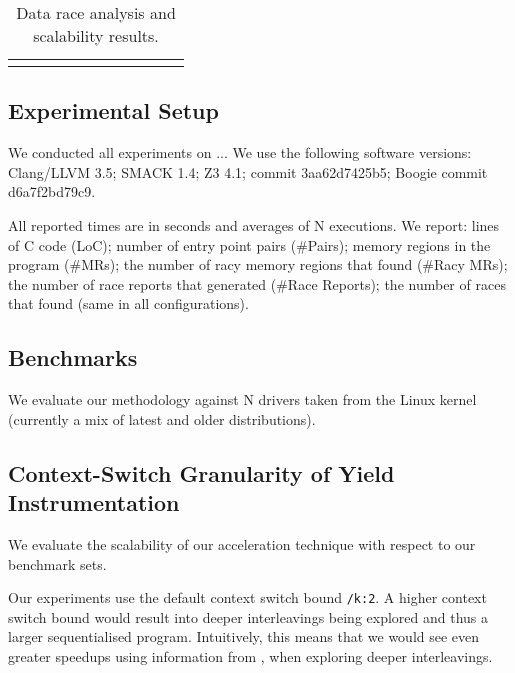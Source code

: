 \newcommand{\colspacing}{\hspace{1.8em}}
\begin{table*}[t]
\small
\centering
\begin{tabular}{l rrr rrr rr r r}
\centering

\end{tabular}
\caption{Data race analysis and scalability results.}
\label{tab:races}
\end{table*}

\subsection{Experimental Setup}
\label{eval:setup}

We conducted all experiments on ... We use the following software versions: Clang/LLVM 3.5; SMACK 1.4; Z3 4.1; \corral commit 3aa62d7425b5; Boogie commit d6a7f2bd79c9.

All reported times are in seconds and averages of N executions. We report: lines of C code (LoC); number of entry point pairs (\#Pairs); memory regions in the program (\#MRs); the number of racy memory regions that \whoop found (\#Racy MRs); the number of race reports that \whoop generated (\#Race Reports); the number of races that \corral found (same in all configurations).

\subsection{Benchmarks}
\label{eval:benchmarks}

We evaluate our methodology against N drivers taken from the Linux kernel (currently a mix of latest and older distributions). 

\subsection{Context-Switch Granularity of Yield Instrumentation}
\label{eval:granularity}

We evaluate the scalability of our acceleration technique with respect to our benchmark sets.

Our experiments use the default \corral context switch bound \texttt{/k:2}. A higher context switch bound would result into deeper interleavings being explored and thus a larger sequentialised program. Intuitively, this means that we would see even greater speedups using information from \whoop, when exploring deeper interleavings. 

